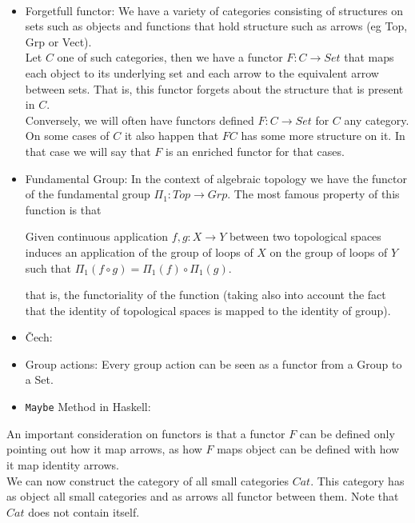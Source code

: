 \begin{example}\ 
  \begin{itemize}
  \item {Forgetfull functor}: We have a variety of categories consisting of structures on sets such as objects and functions that hold structure such as arrows (eg Top, Grp or Vect).\\
    
    Let $C$ one of such  categories, then we have a functor $F:C\to Set$ that maps each object to its underlying set and each arrow to the equivalent arrow between sets. That is, this functor forgets about the structure that is present in $C$.\\

    Conversely, we will often have functors defined $F:C\to Set$ for $C$ any category. On some cases of $C$ it also happen that $FC$ has some more structure on it. In that case we will say that $F$ is an enriched functor for that cases.

  \item Fundamental Group: In the context of algebraic topology we have the functor of the fundamental group $\Pi_1: Top \to Grp$. The most famous property of this function is that

    
    \begin{displayquote}
      Given continuous application $ f,g:X \to Y$ between two topological spaces induces an application of the group of loops of $X$ on the group of loops of $Y$ such that $\Pi_1(f \circ g) = \Pi_1(f) \circ \Pi_1(g)$.
    \end{displayquote}

    that is, the functoriality of the function (taking also into account the fact that the identity of topological spaces is mapped to the identity of group). 

  \item \v{C}ech:
  \item Group actions: Every group action can be seen as a functor from a Group to a Set. 
  \item \texttt{Maybe} Method in Haskell:
  \end{itemize}
\end{example}

An  important consideration on functors is that a functor $F$ can be defined only pointing out how it map arrows, as how $F$ maps object can be defined with how it map identity arrows.\\

We can now construct the category of all small categories $Cat$. This category has as object all small categories and as arrows all functor between them. Note that $Cat$ does not contain itself.\\

